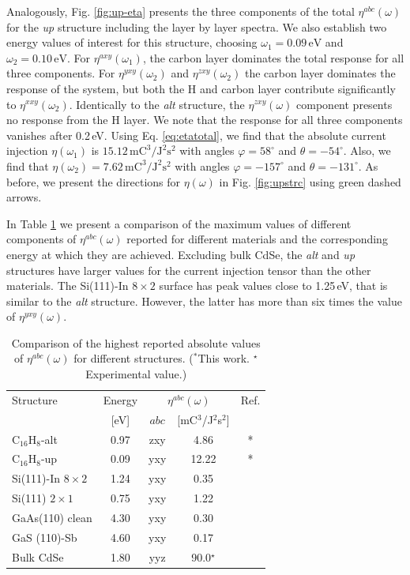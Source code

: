 \documentclass[pss]{wiley2sp} %
\begin{document}
Analogously, Fig. \ref{fig:up-eta} presents the three components of the total
$\eta^{abc}(\omega)$ for the \emph{up} structure including the layer by layer
spectra. We also establish two energy values of interest for this structure,
choosing $\omega_{1} = 0.09\,\mathrm{eV}$ and $\omega_{2} = 0.10\,\mathrm{eV}$. For
$\eta^{axy}(\omega_{1})$, the carbon layer dominates the total response for all three
components. For $\eta^{yxy}(\omega_{2})$ and $\eta^{zxy}(\omega_{2})$ the carbon layer
dominates the response of the system, but both the H and carbon layer contribute
significantly to $\eta^{xxy}(\omega_{2})$. Identically to the \emph{alt} structure,
the $\eta^{zxy}(\omega)$ component presents no response from the H layer.  We
note that the response for all three components vanishes after 0.2\,eV. Using
Eq. \eqref{eq:etatotal}, we find that the absolute current injection $\eta(\omega_{1})$
is $15.12\,\mathrm{mC}^{3}/\mathrm{J}^{2}\mathrm{s}^{2}$ with angles
$\varphi=58^{\circ}$ and $\theta=-54^{\circ}$. Also, we find that
$\eta(\omega_{2})=7.62\,\mathrm{mC}^{3}/\mathrm{J}^{2}\mathrm{s}^{2}$ with angles
$\varphi=-157^{\circ}$ and $\theta=-131^{\circ}$. As before, we present the
directions for $\eta(\omega)$ in Fig. \ref{fig:upstrc} using green dashed
arrows.

In Table \ref{tab:etacomp} we present a comparison of the maximum values of
different components of $\eta^{abc}(\omega)$ reported for different materials
and the corresponding energy at which they are achieved. Excluding bulk CdSe,
the \emph{alt} and \emph{up} structures have larger values for the current
injection tensor than the other materials. The Si(111)-In $8\times 2$ surface
has peak values close to 1.25\,eV, that is similar to the \emph{alt} structure.
However, the latter has more than six times the value of $\eta^{yxy}(\omega)$.

\begin{table}%
\centering
\sidecaption
\begin{tabular}{lcccc}
\hline
\hline
Structure & Energy &  \multicolumn{2}{c}{$\eta^{abc}(\omega)$} &  Ref.\\
\cline{3-4}
          & [eV]   & $abc$ & [mC$^{3}$/J$^{2}$s$^{2}$] \\
\hline
C$_{16}$H$_{8}$-alt     & 0.97  & zxy & 4.86  & *     \\
C$_{16}$H$_{8}$-up      & 0.09  & yxy & 12.22 & *     \\
Si(111)-In $8\times2$   & 1.24  & yxy & 0.35  & \cite{arzatePRB14}  \\
Si(111) $2\times1$      & 0.75  & yxy & 1.22  & \cite{cabellosPRB11} \\
GaAs(110) clean         & 4.30  & yxy & 0.30  & \cite{cabellosPRB11}     \\
GaS (110)-Sb            & 4.60  & yxy & 0.17  & \cite{cabellosPRB11}\\
Bulk CdSe               & 1.80  & yyz & 90.0$^{\star}$  & \cite{lamanAPL99}\\
\hline
\hline
\end{tabular}
\caption[]{%
Comparison of the highest reported absolute values of {$\eta^{abc}(\omega)$}
for different structures. ($^{*}$This work. $^{\star}$Experimental value.)}
\label{tab:etacomp}
\end{table}
\end{document}
